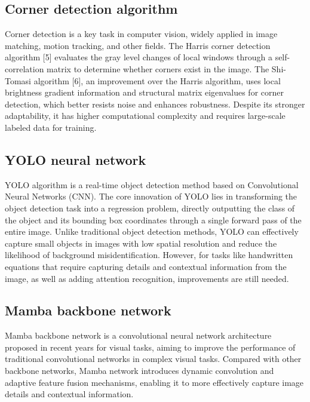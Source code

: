 \documentclass[
]{article}
\begin{document}
\subsection{Corner detection
algorithm}\label{corner-detection-algorithm}

Corner detection is a key task in computer vision, widely applied in
image matching, motion tracking, and other fields. The Harris corner
detection algorithm {[}5{]} evaluates the gray level changes of local
windows through a self-correlation matrix to determine whether corners
exist in the image. The Shi-Tomasi algorithm {[}6{]}, an improvement
over the Harris algorithm, uses local brightness gradient information
and structural matrix eigenvalues for corner detection, which better
resists noise and enhances robustness. Despite its stronger
adaptability, it has higher computational complexity and requires
large-scale labeled data for training.

\subsection{YOLO neural network}\label{yolo-neural-network}

YOLO algorithm is a real-time object detection method based on
Convolutional Neural Networks (CNN). The core innovation of YOLO lies in
transforming the object detection task into a regression problem,
directly outputting the class of the object and its bounding box
coordinates through a single forward pass of the entire image. Unlike
traditional object detection methods, YOLO can effectively capture small
objects in images with low spatial resolution and reduce the likelihood
of background misidentification. However, for tasks like handwritten
equations that require capturing details and contextual information from
the image, as well as adding attention recognition, improvements are
still needed.

\subsection{Mamba backbone network}\label{mamba-backbone-network}

Mamba backbone network is a convolutional neural network architecture
proposed in recent years for visual tasks, aiming to improve the
performance of traditional convolutional networks in complex visual
tasks. Compared with other backbone networks, Mamba network introduces
dynamic convolution and adaptive feature fusion mechanisms, enabling it
to more effectively capture image details and contextual information.
\end{document}
